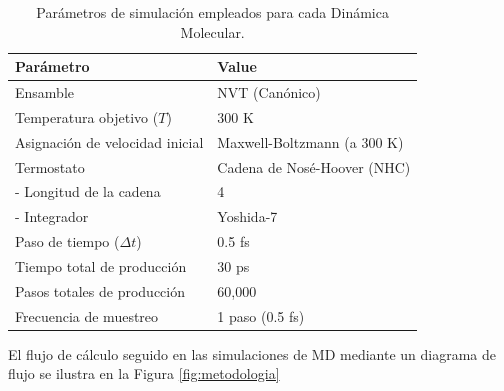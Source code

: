 \begin{table}[H]
    \centering
    \caption{Parámetros de simulación empleados para cada Dinámica Molecular.}
    \label{tab:md_params}
    \begin{tabular}{ll}
        \hline
        \textbf{Parámetro} & \textbf{Value} \\ \hline
        Ensamble & NVT (Canónico) \\
        Temperatura objetivo ($T$) & 300 K \\
        Asignación de velocidad inicial & Maxwell-Boltzmann (a 300 K) \\
        Termostato & Cadena de Nosé-Hoover (NHC) \\
        \quad - Longitud de la cadena & 4 \\
        \quad - Integrador & Yoshida-7 \\
        Paso de tiempo ($\Delta t$) & 0.5 fs \\
        Tiempo total de producción & 30 ps \\
        Pasos totales de producción & 60,000 \\
        Frecuencia de muestreo & 1 paso (0.5 fs) \\ \hline
    \end{tabular}
\end{table}

El flujo de cálculo seguido en las simulaciones de MD mediante un diagrama de flujo se ilustra en la Figura \ref{fig:metodologia}


